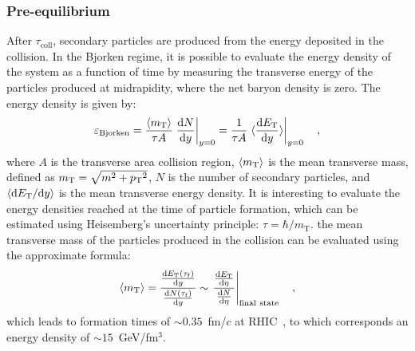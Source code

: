 \subsubsection{Pre-equilibrium}
After $\tau_\mathrm{coll}$, secondary particles are produced from the energy deposited in the collision. In the Bjorken regime, it is possible to evaluate the energy density of the system as a function of time by measuring the transverse energy of the particles produced at midrapidity, where the net baryon density is zero. The energy density is given by:
\begin{equation*}
    \varepsilon_\mathrm{Bjorken} = \frac{\braket{m_\mathrm{T}}}{\tau A} \left. \frac{\mathrm{d} N}{\mathrm{d} y}\right\rvert_{y=0} = \frac{1}{\tau A}\left. \braket{\frac{\mathrm{d} E_\mathrm{T}}{\mathrm{d} y}}\right\rvert_{y=0} \quad ,
\end{equation*}
where $A$ is the transverse area collision region, $\braket{m_\mathrm{T}}$ is the mean transverse mass, defined as $m_\mathrm{T} = \sqrt{m^2 + p\mathrm{_T}^2}$, $N$ is the number of secondary particles, and $\braket{\mathrm{d} E_\mathrm{T}/\mathrm{d} y}$ is the mean transverse energy density. It is interesting to evaluate the energy densities reached at the time of particle formation, which can be estimated using Heisemberg's uncertainty principle: $\tau = \hbar/m_\mathrm{T}$. the mean transverse mass of the particles produced in the collision can be evaluated using the approximate formula:
\begin{equation*}
    \braket{m_\mathrm{T}} = \frac{\frac{\mathrm{d} E_\mathrm{T}(\tau_\mathrm{f})}{\mathrm{d} y}}{\frac{\mathrm{d} N(\tau_\mathrm{f})}{\mathrm{d} y}}\sim \left. \frac{\frac{\mathrm{d} E_\mathrm{T}}{\mathrm{d} \eta}}{\frac{\mathrm{d} N}{\mathrm{d} \eta}}\right\rvert_\mathrm{final~state}\quad ,
\end{equation*}
which leads to formation times of $\sim 0.35$~fm/$c$ at RHIC~\cite{PHENIX:2004vcz}, to which corresponds an energy density of $\sim 15$~GeV/fm$^3$.


